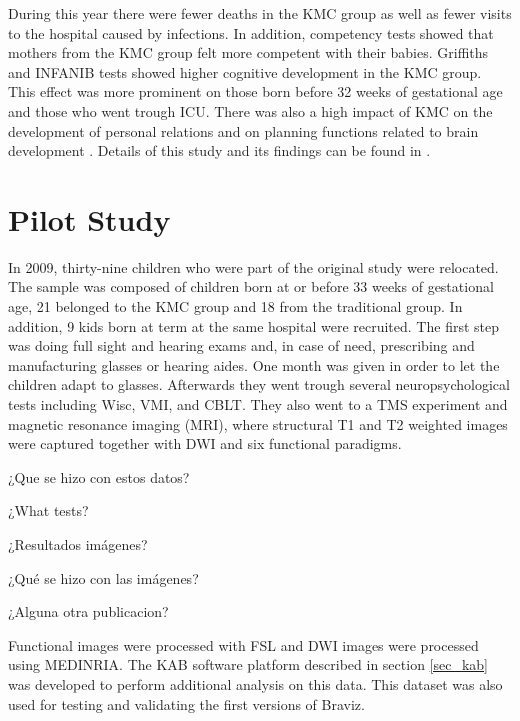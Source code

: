 During this year there were fewer deaths in the KMC group as well as fewer visits to the hospital caused by infections. In addition, competency tests showed that mothers from the KMC group felt more competent with their babies. Griffiths and INFANIB tests showed higher cognitive development in the KMC group. This effect was more prominent on those born before 32 weeks of gestational age and those who went trough ICU. There was also a high impact of KMC on the development of personal relations and on planning functions related to brain development \autocite{tessier_kangaroo_2003}. Details of this study and its findings can be found in \autocite{charpak_current_1996,charpak_kangaroo_1997,charpak_randomized_2001,charpak_kangaroo_2005}.



\section{Pilot Study}


In 2009, thirty-nine children who were part of the original study were relocated. The sample was composed of children born at or before 33 weeks of gestational age, 21 belonged to the KMC group and 18 from the traditional group. In addition, 9 kids born at term at the same hospital were recruited. 
The first step was doing full sight and hearing exams and, in case of need, prescribing and manufacturing glasses or hearing aides. One month was given in order to let the children adapt to glasses. Afterwards they went trough several neuropsychological tests including Wisc, VMI, and CBLT. They also went to a TMS experiment and magnetic resonance imaging (MRI), where structural T1 and T2 weighted images were captured together with DWI and six functional paradigms. 

¿Que se hizo con estos datos?

¿What tests?

¿Resultados imágenes?

¿Qué se hizo con las imágenes?

¿Alguna otra publicacion?


Functional images were processed with FSL and DWI images were processed using MEDINRIA. The KAB software platform described in section \ref{sec_kab} was developed to perform additional analysis on this data. This dataset was also used for testing and validating the first versions of Braviz.

